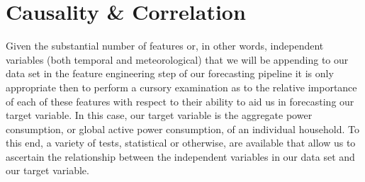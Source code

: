 \section{Causality \& Correlation}
\label{sec:Exploratory-Data-Analysis:Causality-and-Correlation}
Given the substantial number of features or, in other words, independent variables (both temporal and meteorological) that we will be appending to our data set in the feature engineering step of our forecasting pipeline it is only appropriate then to perform a cursory examination as to the relative importance of each of these features with respect to their ability to aid us in forecasting our target variable. In this case, our target variable is the aggregate power consumption, or global active power consumption, of an individual household. To this end, a variety of tests, statistical or otherwise, are available that allow us to ascertain the relationship between the independent variables in our data set and our target variable.

